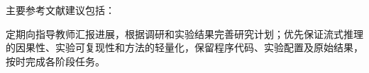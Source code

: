 主要参考文献建议包括：

\nocite{anderson2018vln,krantz2020vlnce,zhang2024navid,zhang2025uninavid,%
        cheng2025navila,wei2025streamvln,zhang2025mapnav,krantz2021waypoint,%
        ramakrishnan2021hm3d}
\printbibliography[heading=none]


定期向指导教师汇报进展，根据调研和实验结果完善研究计划；优先保证流式推理的因果性、实验可复现性和方法的轻量化，保留程序代码、实验配置及原始结果，按时完成各阶段任务。

\vfill
